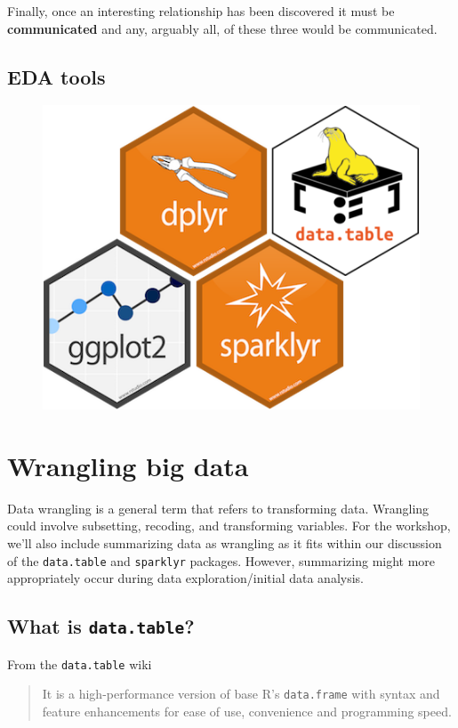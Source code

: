 \documentclass[]{book}
\begin{document}
Finally, once an interesting relationship has been discovered it must be \textbf{communicated} and any, arguably all, of these three would be communicated.

\hypertarget{eda-tools}{%
\section{EDA tools}\label{eda-tools}}

\begin{figure}
\includegraphics[width=0.6\linewidth]{images/allfour} \end{figure}

\hypertarget{wrangling-big-data}{%
\chapter{Wrangling big data}\label{wrangling-big-data}}

Data wrangling is a general term that refers to transforming data. Wrangling could involve subsetting, recoding, and transforming variables. For the workshop, we'll also include summarizing data as wrangling as it fits within our discussion of the \texttt{data.table} and \texttt{sparklyr} packages. However, summarizing might more appropriately occur during data exploration/initial data analysis.

\hypertarget{what-is-data.table}{%
\section{\texorpdfstring{What is \texttt{data.table}?}{What is data.table?}}\label{what-is-data.table}}

From the \texttt{data.table} wiki

\begin{quote}
It is a high-performance version of base R's \texttt{data.frame} with syntax and feature enhancements for ease of use, convenience and programming speed.
\end{quote}
\end{document}

